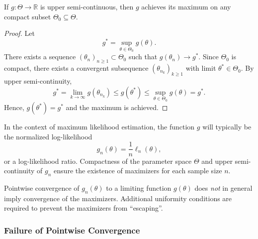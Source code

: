 \begin{lemma}
\label{lem:usc-compact-max}
If $g:\Theta \to \mathbb{R}$ is upper semi-continuous, then $g$ achieves its maximum on any compact subset $\Theta_0 \subseteq \Theta$.
\end{lemma}

\begin{proof}
Let
\begin{equation*}
g^* = \sup_{\theta \in \Theta_0} g(\theta).
\end{equation*}
There exists a sequence $(\theta_n)_{n \ge 1} \subset \Theta_0$ such that $g(\theta_n) \to g^*$. Since $\Theta_0$ is compact, there exists a convergent subsequence $(\theta_{n_k})_{k \ge 1}$ with limit $\theta^* \in \Theta_0$. By upper semi-continuity,
\begin{equation*}
g^* = \lim_{k \to \infty} g(\theta_{n_k})
\le g(\theta^*)
\le \sup_{\theta \in \Theta_0} g(\theta)
= g^*.
\end{equation*}
Hence, $g(\theta^*) = g^*$ and the maximum is achieved.
\end{proof}

\bigskip


\begin{note}
In the context of maximum likelihood estimation, the function $g$ will typically be the normalized log-likelihood
\[
g_n(\theta) = \frac{1}{n}\ell_n(\theta),
\]
or a log-likelihood ratio. Compactness of the parameter space $\Theta$ and upper semi-continuity of $g_n$ ensure the existence of maximizers for each sample size $n$.
\end{note}

\begin{remark}
Pointwise convergence of $g_n(\theta)$ to a limiting function $g(\theta)$ does \emph{not} in general imply convergence of the maximizers. Additional uniformity conditions are required to prevent the maximizers from ``escaping''.
\end{remark}

\subsubsection{Failure of Pointwise Convergence}

